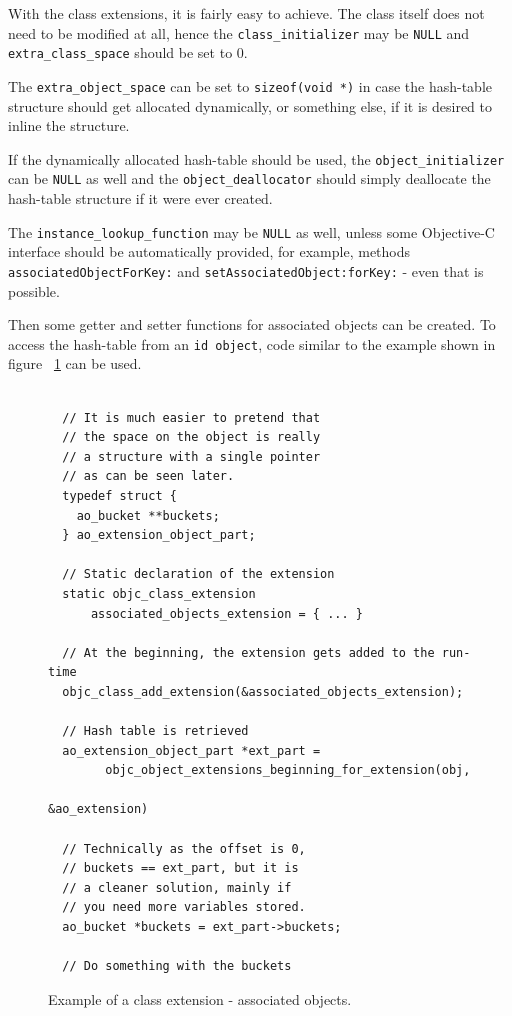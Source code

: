 With the class extensions, it is fairly easy to achieve. The class itself does not need to be modified at all, hence the \verb=class_initializer= may be \verb=NULL= and \verb=extra_class_space= should be set to 0.

The \verb=extra_object_space= can be set to \verb=sizeof(void *)= in case the hash-table structure should get allocated dynamically, or something else, if it is desired to inline the structure.

If the dynamically allocated hash-table should be used, the \newline{}\verb=object_initializer= can be \verb=NULL= as well and the \verb=object_deallocator= should simply deallocate the hash-table structure if it were ever created.

The \verb=instance_lookup_function= may be \verb=NULL= as well, unless some Objective-C interface should be automatically provided, for example, methods \newline{}\verb=associatedObjectForKey:= and \verb=setAssociatedObject:forKey:= - even that is possible.

Then some getter and setter functions for associated objects can be created. To access the hash-table from an \verb=id object=, code similar to the example shown in figure ~\ref{fig:class_ext_ao} can be used.

\begin{figure}[H] 
\begin{verbatim}
  
  // It is much easier to pretend that
  // the space on the object is really
  // a structure with a single pointer
  // as can be seen later.
  typedef struct {
    ao_bucket **buckets;
  } ao_extension_object_part;
  
  // Static declaration of the extension
  static objc_class_extension 
      associated_objects_extension = { ... }

  // At the beginning, the extension gets added to the run-time
  objc_class_add_extension(&associated_objects_extension);

  // Hash table is retrieved
  ao_extension_object_part *ext_part = 
        objc_object_extensions_beginning_for_extension(obj, 
                                                      &ao_extension)

  // Technically as the offset is 0,
  // buckets == ext_part, but it is
  // a cleaner solution, mainly if
  // you need more variables stored.
  ao_bucket *buckets = ext_part->buckets;
        
  // Do something with the buckets
\end{verbatim}
  \centering{}
  \caption{Example of a class extension - associated objects.}
  \label{fig:class_ext_ao}
\end{figure}


